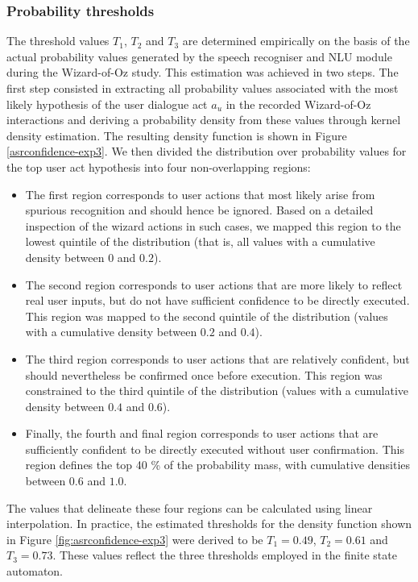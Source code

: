 \subsubsection*{Probability thresholds}

The threshold values $T_1$, $T_2$ and $T_3$ are determined empirically on the basis of the actual probability values generated by the speech recogniser and NLU module during the Wizard-of-Oz study.  This estimation was achieved in two steps.  The first step consisted in  extracting all probability values associated with the most likely hypothesis of the user dialogue act $a_u$ in the recorded Wizard-of-Oz interactions and deriving a probability density from these values through kernel density estimation. The resulting density function is shown in Figure \ref{asrconfidence-exp3}. We then divided the distribution over probability values for the top user act hypothesis into four non-overlapping regions:
\begin{itemize}
\item The first region corresponds to user actions that most likely arise from spurious recognition and should hence be ignored. Based on a detailed inspection of the wizard actions in such cases, we mapped this region to the lowest quintile of the distribution (that is, all values with a cumulative density between $0$ and $0.2$). 
\item The second region corresponds to user actions that are more likely to reflect real user inputs, but do not have sufficient confidence to be directly executed.  This region was mapped to the second quintile of the distribution (values with a cumulative density between $0.2$ and $0.4$).
\item The third region corresponds to user actions that are relatively confident, but should nevertheless be confirmed once before execution.  This region was constrained to the third quintile of the distribution (values with a cumulative density between $0.4$ and $0.6$).
\item Finally, the fourth and final region corresponds to user actions that are sufficiently confident to be directly executed without user confirmation. This region defines the top 40 \% of the probability mass, with cumulative densities between $0.6$ and $1.0$.
\end{itemize}

The values that delineate these four regions can be calculated using linear interpolation. In practice, the estimated thresholds for the density function shown in Figure \ref{fig:asrconfidence-exp3} were derived to be $T_1 = 0.49$, $T_2 = 0.61$ and $T_3 = 0.73$. These values reflect the three thresholds employed in the finite state automaton. 


